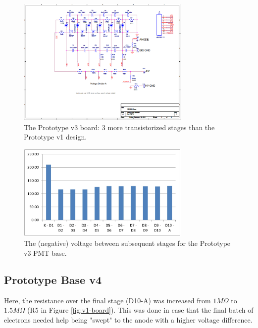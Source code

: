 \documentclass[11pt]{article}
\begin{document}
\begin{figure}[h]
    \centerline{
    \mbox{\includegraphics[width=0.75\textwidth]{newbase_6mosfet.png}}
    }
    \caption{The Prototype v3 board: 3 more transistorized stages than the Prototype v1 design.}
    \label{fig:v3-board}
\end{figure}

\begin{figure}[h]
    \centerline{
    \mbox{\includegraphics[width=0.75\textwidth]{v3-volt.jpg}}
    }
    \caption{The (negative) voltage between subsequent stages for the Prototype v3 PMT base.}
    \label{fig:v3-volt}
\end{figure}
\newpage
\subsection{Prototype Base v4}

Here, the resistance over the final stage (D10-A) was increased from $1M\Omega$ to $1.5M\Omega$ (R5 in Figure \ref{fig:v1-board}). This was done in case that the final batch of electrons needed help being "swept" to the anode with a higher voltage difference.
\end{document}
